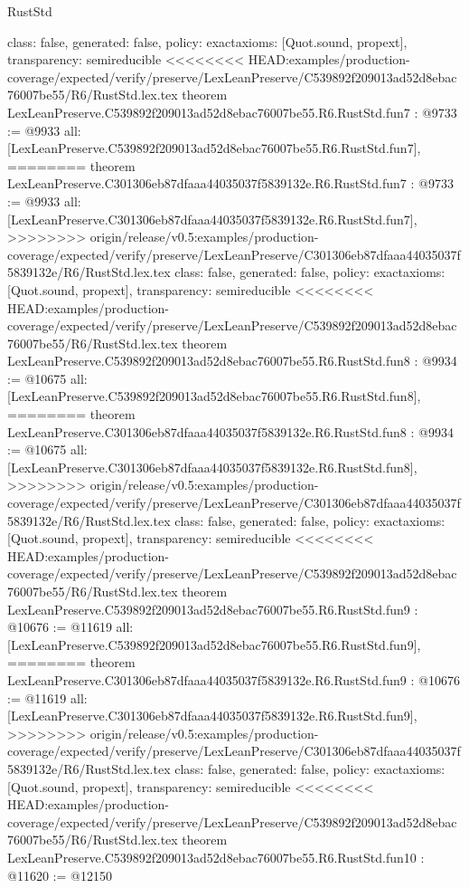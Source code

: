 \begin{lexlean}{RustStd}
\begin{coremodule}
{\begin{coremodule}
{{{{{{{{{{  class: false,
  generated: false,
  policy: exact{axioms: [Quot.sound, propext]},
  transparency: semireducible
}
<<<<<<<< HEAD:examples/production-coverage/expected/verify/preserve/LexLeanPreserve/C539892f209013ad52d8ebac76007be55/R6/RustStd.lex.tex
theorem LexLeanPreserve.C539892f209013ad52d8ebac76007be55.R6.RustStd.fun7 : @9733 := @9933 {
  all: [LexLeanPreserve.C539892f209013ad52d8ebac76007be55.R6.RustStd.fun7],
========
theorem LexLeanPreserve.C301306eb87dfaaa44035037f5839132e.R6.RustStd.fun7 : @9733 := @9933 {
  all: [LexLeanPreserve.C301306eb87dfaaa44035037f5839132e.R6.RustStd.fun7],
>>>>>>>> origin/release/v0.5:examples/production-coverage/expected/verify/preserve/LexLeanPreserve/C301306eb87dfaaa44035037f5839132e/R6/RustStd.lex.tex
  class: false,
  generated: false,
  policy: exact{axioms: [Quot.sound, propext]},
  transparency: semireducible
}
<<<<<<<< HEAD:examples/production-coverage/expected/verify/preserve/LexLeanPreserve/C539892f209013ad52d8ebac76007be55/R6/RustStd.lex.tex
theorem LexLeanPreserve.C539892f209013ad52d8ebac76007be55.R6.RustStd.fun8 : @9934 := @10675 {
  all: [LexLeanPreserve.C539892f209013ad52d8ebac76007be55.R6.RustStd.fun8],
========
theorem LexLeanPreserve.C301306eb87dfaaa44035037f5839132e.R6.RustStd.fun8 : @9934 := @10675 {
  all: [LexLeanPreserve.C301306eb87dfaaa44035037f5839132e.R6.RustStd.fun8],
>>>>>>>> origin/release/v0.5:examples/production-coverage/expected/verify/preserve/LexLeanPreserve/C301306eb87dfaaa44035037f5839132e/R6/RustStd.lex.tex
  class: false,
  generated: false,
  policy: exact{axioms: [Quot.sound, propext]},
  transparency: semireducible
}
<<<<<<<< HEAD:examples/production-coverage/expected/verify/preserve/LexLeanPreserve/C539892f209013ad52d8ebac76007be55/R6/RustStd.lex.tex
theorem LexLeanPreserve.C539892f209013ad52d8ebac76007be55.R6.RustStd.fun9 : @10676 := @11619 {
  all: [LexLeanPreserve.C539892f209013ad52d8ebac76007be55.R6.RustStd.fun9],
========
theorem LexLeanPreserve.C301306eb87dfaaa44035037f5839132e.R6.RustStd.fun9 : @10676 := @11619 {
  all: [LexLeanPreserve.C301306eb87dfaaa44035037f5839132e.R6.RustStd.fun9],
>>>>>>>> origin/release/v0.5:examples/production-coverage/expected/verify/preserve/LexLeanPreserve/C301306eb87dfaaa44035037f5839132e/R6/RustStd.lex.tex
  class: false,
  generated: false,
  policy: exact{axioms: [Quot.sound, propext]},
  transparency: semireducible
}
<<<<<<<< HEAD:examples/production-coverage/expected/verify/preserve/LexLeanPreserve/C539892f209013ad52d8ebac76007be55/R6/RustStd.lex.tex
theorem LexLeanPreserve.C539892f209013ad52d8ebac76007be55.R6.RustStd.fun10 : @11620 := @12150 {
}}}}}}}}}}}}}
\end{coremodule}}
\end{coremodule}
\end{lexlean}
